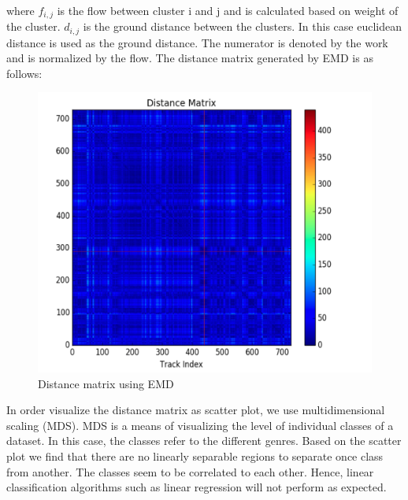 \documentclass[12pt]{article}
\begin{document}
\paragraph{}
where $f_{i,j}$ is the flow between cluster i and j and is calculated based on weight of the cluster. $d_{i,j}$ is the ground distance between the clusters. In this case euclidean distance is used as the ground distance. The numerator is denoted by the work and is normalized by the flow. The distance matrix generated by EMD is as follows:
\begin{figure}[H]\label{emd_dist}
\center
\includegraphics[scale=0.70]{emd_dist.png}
\caption{Distance matrix using EMD}
\end{figure}
In order visualize the distance matrix as scatter plot, we use multidimensional scaling (MDS). MDS is a means of visualizing the level of individual classes of a dataset. In this case, the classes refer to the different genres. Based on the scatter plot we find that there are no linearly separable regions to separate once class from another. The classes seem to be correlated to each other. Hence, linear classification algorithms such as linear regression will not perform as expected.
\end{document}
